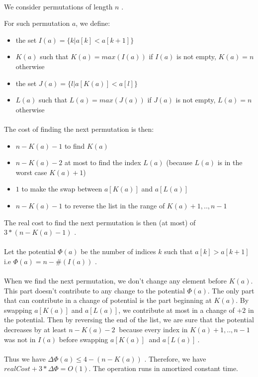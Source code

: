 

\paragraph{}
We consider permutations of length $n$ .

For such permutation $a$, we define:
\begin{itemize}
\item{} the set $I(a)=\{k | a[k]<a[k+1]\}$
\item{} $K(a)$ such that $K(a)= max(I(a))$ if $I(a)$ is not empty, $K(a)=n$ otherwise
\item{} the set $J(a)=\{l | a[K(a)]<a[l]\}$
\item{} $L(a)$ such that $L(a) = max(J(a))$ if $J(a)$ is not empty, $L(a)=n$ otherwise
\end{itemize}

\paragraph{}
The cost of finding the next permutation is then:
\begin{itemize}
\item{} $n-K(a)-1$ to find $K(a)$
\item{} $n-K(a)-2$ at most to find the index $L(a)$ (because $L(a)$ is in the worst case $K(a)+1$)
\item{} $1$ to make the swap between $a[K(a)]$ and $a[L(a)]$
\item{} $n-K(a)-1$ to reverse the list in the range of $K(a)+1,..,n-1$
\end{itemize}
The real cost to find the next permutation is then (at most) of $3*(n-K(a)-1)$ .

\paragraph{}
Let the potential $\Phi(a)$ be the number of indices $k$ such that $a[k]>a[k+1]$
\newline
i.e $\Phi(a)=n-\#(I(a))$ .

\paragraph{}
When we find the next permutation, we don't change any element before $K(a)$. This part doesn't contribute to any change to the potential $\Phi(a)$. The only part that can contribute in a change of potential is the part beginning at $K(a)$.
\newline
By swapping $a[K(a)]$ and $a[L(a)]$, we contribute at most in a change of $+2$ in the potential. Then by reversing the end of the list, we are sure that the potential decreases by at least $n-K(a)-2\ $ because every index in $K(a)+1,..,n-1$ was not in $I(a)$ before swapping $a[K(a)]\ $ and $a[L(a)]\ $.
\paragraph{}
Thus we have $\Delta\Phi(a)\leq{4-(n-K(a))}$ .
\newline
Therefore, we have $realCost+3*\Delta\Phi=O(1)$. The operation runs in amortized constant time.